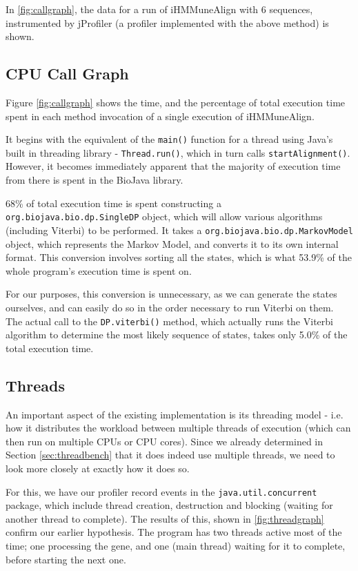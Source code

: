 \documentclass[a4paper,12pt]{report}
\begin{document}
In \autoref{fig:callgraph}, the data for a run of iHMMuneAlign with 6 sequences, instrumented by jProfiler (a profiler implemented with the above method) is shown.

\subsection{CPU Call Graph}
\label{sec:cpuprof}
Figure \autoref{fig:callgraph} shows the time, and the percentage of total execution time spent in each method invocation of a single execution of iHMMuneAlign.

It begins with the equivalent of the \texttt{main()} function for a thread using Java's built in threading library - \texttt{Thread.run()}, which in turn calls \texttt{startAlignment()}. However, it becomes immediately apparent that the majority of execution time from there is spent in the BioJava library.

68\% of total execution time is spent constructing a \texttt{org.biojava.bio.dp.SingleDP} object, which will allow various algorithms (including Viterbi) to be performed. It takes a \texttt{org.biojava.bio.dp.MarkovModel} object, which represents the Markov Model, and converts it to its own internal format. This conversion involves sorting all the states, which is what 53.9\% of the whole program's execution time is spent on.

For our purposes, this conversion is unnecessary, as we can generate the states ourselves, and can easily do so in the order necessary to run Viterbi on them. The actual call to the \texttt{DP.viterbi()} method, which actually runs the Viterbi algorithm to determine the most likely sequence of states, takes only 5.0\% of the total execution time.

\subsection{Threads}
\label{sec:threadprof}
An important aspect of the existing implementation is its threading model - i.e. how it distributes the workload between multiple threads of execution (which can then run on multiple CPUs or CPU cores). Since we already determined in Section \ref{sec:threadbench} that it does indeed use multiple threads, we need to look more closely at exactly how it does so.

For this, we have our profiler record events in the \texttt{java.util.concurrent} package, which include thread creation, destruction and blocking (waiting for another thread to complete). The results of this, shown in \autoref{fig:threadgraph} confirm our earlier hypothesis. The program has two threads active most of the time; one processing the gene, and one (main thread) waiting for it to complete, before starting the next one.
\end{document}
